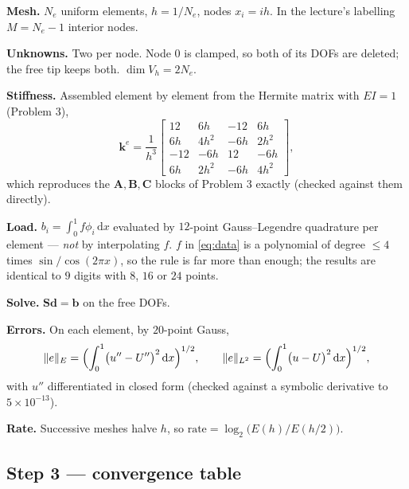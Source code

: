 \documentclass[11pt]{article}
\newcommand{\dx}{\,\mathrm{d}x}
\newcommand{\norm}[1]{\lVert #1\rVert}
\begin{document}
\begin{steps}
\item \textbf{Mesh.}  $N_{e}$ uniform elements, $h=1/N_{e}$, nodes
      $x_{i}=ih$.  In the lecture's labelling $M=N_{e}-1$ interior nodes.
\item \textbf{Unknowns.}  Two per node.  Node $0$ is clamped, so both of its
      DOFs are deleted; the free tip keeps both.  $\dim V_{h}=2N_{e}$.
\item \textbf{Stiffness.}  Assembled element by element from the Hermite
      matrix with $EI=1$ (Problem 3),
\[
  \bm{k}^{e}=\frac{1}{h^{3}}
  \begin{bmatrix}
    12 & 6h & -12 & 6h\\
    6h & 4h^{2} & -6h & 2h^{2}\\
    -12 & -6h & 12 & -6h\\
    6h & 2h^{2} & -6h & 4h^{2}
  \end{bmatrix},
\]
      which reproduces the $\bm{A},\bm{B},\bm{C}$ blocks of Problem 3 exactly
      (checked against them directly).
\item \textbf{Load.}  $b_{i}=\int_{0}^{1}f\phi_{i}\dx$ evaluated by
      $12$-point Gauss--Legendre quadrature per element --- \emph{not} by
      interpolating $f$.  $f$ in \eqref{eq:data} is a polynomial of degree
      $\le4$ times $\sin/\cos(2\pi x)$, so the rule is far more than enough;
      the results are identical to $9$ digits with $8$, $16$ or $24$ points.
\item \textbf{Solve.}  $\bm{S}\bm{d}=\bm{b}$ on the free DOFs.
\item \textbf{Errors.}  On each element, by $20$-point Gauss,
\[
  \norm{e}_{E}=\Bigl(\int_{0}^{1}\bigl(u''-U''\bigr)^{2}\dx\Bigr)^{1/2},
  \qquad
  \norm{e}_{L^{2}}=\Bigl(\int_{0}^{1}\bigl(u-U\bigr)^{2}\dx\Bigr)^{1/2},
\]
      with $u''$ differentiated in closed form (checked against a symbolic
      derivative to $5\times10^{-13}$).
\item \textbf{Rate.}  Successive meshes halve $h$, so
      $\text{rate}=\log_{2}\bigl(E(h)/E(h/2)\bigr)$.
\end{steps}

\subsection*{Step 3 --- convergence table}

\begin{center}\small

\end{center}
\end{document}
